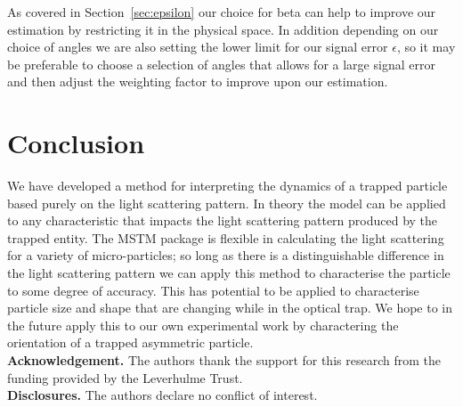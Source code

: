 \documentclass[final, 3p]{elsarticle}
\begin{document}
As covered in Section~\ref{sec:epsilon} our choice for beta can help to improve our estimation by restricting it in the physical space. In addition depending on our choice of angles we are also setting the lower limit for our signal error $\epsilon$, so it may be preferable to choose a selection of angles that allows for a large signal error and then adjust the weighting factor to improve upon our estimation.
\section{Conclusion}
\label{sec:Conclusion}

We have developed a method for interpreting the dynamics of a trapped particle based purely on the light scattering pattern. In theory the model can be applied to any characteristic that impacts the light scattering pattern produced by the trapped entity. The MSTM package is flexible in calculating the light scattering for a variety of micro-particles; so long as there is a distinguishable difference in the light scattering pattern we can apply this method to characterise the particle to some degree of accuracy. This has potential to be applied to characterise particle size and shape that are changing while in the optical trap. We hope to in the future apply this to our own experimental work by charactering the orientation of a trapped asymmetric particle.\\

\noindent \textbf{Acknowledgement.} The authors thank the support for this research from the funding provided by the Leverhulme Trust. \\
  
\noindent \textbf{Disclosures.} The authors declare no conflict of interest. \\


 



\newpage
\appendix
\onecolumn
\end{document}
